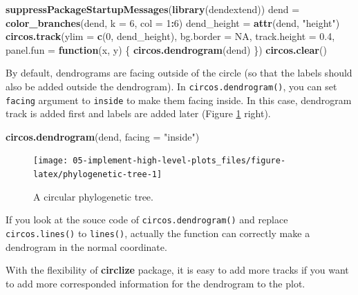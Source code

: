 \documentclass[]{book}
\newenvironment{Shaded}{\begin{snugshade}}{\end{snugshade}}
\newcommand{\KeywordTok}[1]{\textcolor[rgb]{0.13,0.29,0.53}{\textbf{#1}}}
\newcommand{\DataTypeTok}[1]{\textcolor[rgb]{0.13,0.29,0.53}{#1}}
\newcommand{\DecValTok}[1]{\textcolor[rgb]{0.00,0.00,0.81}{#1}}
\newcommand{\FloatTok}[1]{\textcolor[rgb]{0.00,0.00,0.81}{#1}}
\newcommand{\StringTok}[1]{\textcolor[rgb]{0.31,0.60,0.02}{#1}}
\newcommand{\OtherTok}[1]{\textcolor[rgb]{0.56,0.35,0.01}{#1}}
\newcommand{\ControlFlowTok}[1]{\textcolor[rgb]{0.13,0.29,0.53}{\textbf{#1}}}
\newcommand{\OperatorTok}[1]{\textcolor[rgb]{0.81,0.36,0.00}{\textbf{#1}}}
\newcommand{\NormalTok}[1]{#1}
\begin{document}
\begin{Shaded}
\begin{Highlighting}[]
\KeywordTok{suppressPackageStartupMessages}\NormalTok{(}\KeywordTok{library}\NormalTok{(dendextend))}
\NormalTok{dend =}\StringTok{ }\KeywordTok{color_branches}\NormalTok{(dend, }\DataTypeTok{k =} \DecValTok{6}\NormalTok{, }\DataTypeTok{col =} \DecValTok{1}\OperatorTok{:}\DecValTok{6}\NormalTok{)}
\NormalTok{dend_height =}\StringTok{ }\KeywordTok{attr}\NormalTok{(dend, }\StringTok{"height"}\NormalTok{)}
\KeywordTok{circos.track}\NormalTok{(}\DataTypeTok{ylim =} \KeywordTok{c}\NormalTok{(}\DecValTok{0}\NormalTok{, dend_height), }\DataTypeTok{bg.border =} \OtherTok{NA}\NormalTok{, }
    \DataTypeTok{track.height =} \FloatTok{0.4}\NormalTok{, }\DataTypeTok{panel.fun =} \ControlFlowTok{function}\NormalTok{(x, y) \{}
        \KeywordTok{circos.dendrogram}\NormalTok{(dend)}
\NormalTok{\})}
\KeywordTok{circos.clear}\NormalTok{()}
\end{Highlighting}
\end{Shaded}

By default, dendrograms are facing outside of the circle (so that the
labels should also be added outside the dendrogram). In
\texttt{circos.dendrogram()}, you can set \texttt{facing} argument to
\texttt{inside} to make them facing inside. In this case, dendrogram
track is added first and labels are added later (Figure
\ref{fig:phylogenetic-tree} right).

\begin{Shaded}
\begin{Highlighting}[]
\KeywordTok{circos.dendrogram}\NormalTok{(dend, }\DataTypeTok{facing =} \StringTok{"inside"}\NormalTok{)}
\end{Highlighting}
\end{Shaded}

\begin{figure}

{\centering \texttt{[image: 05-implement-high-level-plots\_files/figure-latex/phylogenetic-tree-1]} 

}

\caption{A circular phylogenetic tree.}\label{fig:phylogenetic-tree}
\end{figure}

If you look at the souce code of \texttt{circos.dendrogram()} and
replace \texttt{circos.lines()} to \texttt{lines()}, actually the
function can correctly make a dendrogram in the normal coordinate.

With the flexibility of \textbf{circlize} package, it is easy to add
more tracks if you want to add more corresponded information for the
dendrogram to the plot.
\end{document}
